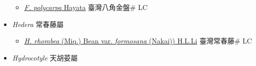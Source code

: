 \begin{itemize}
  \begin{itemize}
        \item[] \href{http://www.theplantlist.org/tpl1.1/search?q=Fatsia+polycarpa}{\textit{F. polycarpa} Hayata}   臺灣八角金盤\# LC
  \end{itemize}
 \item[] \textit{Hedera} 常春藤屬
                    
  \begin{itemize}
        \item[] \href{http://www.theplantlist.org/tpl1.1/search?q=Hedera+rhombea+var.+formosana}{\textit{H. rhombea} (Miq.) Bean var. \textit{formosana} (Nakai)) H.L.Li}   臺灣常春藤\# LC
  \end{itemize}
 \item[] \textit{Hydrocotyle} 天胡荽屬
                    

\end{itemize}

